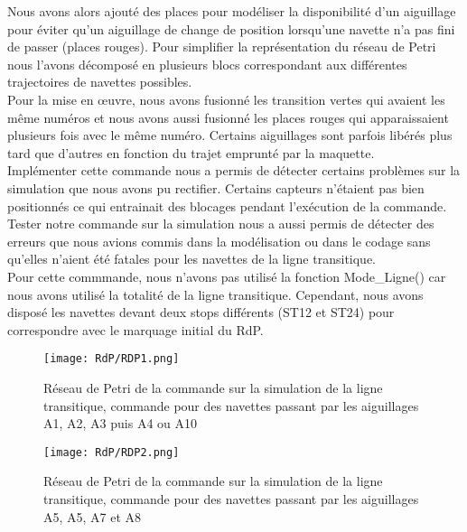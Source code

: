 \documentclass[a4paper,french, titlepage]{book}
\begin{document}
Nous avons alors ajouté des places pour modéliser la disponibilité d'un aiguillage pour éviter qu'un aiguillage de change de position lorsqu'une navette n'a pas fini de passer (places rouges). Pour simplifier la représentation du réseau de Petri nous l'avons décomposé en plusieurs blocs correspondant aux différentes trajectoires de navettes possibles.\\

Pour la mise en œuvre, nous avons fusionné les transition vertes qui avaient les même numéros et nous avons aussi fusionné les places rouges qui apparaissaient plusieurs fois avec le même numéro. Certains aiguillages sont parfois libérés plus tard que d'autres en fonction du trajet emprunté par la maquette.\\

Implémenter cette commande nous a permis de détecter certains problèmes sur la simulation que nous avons pu rectifier. Certains capteurs n'étaient pas bien positionnés ce qui entrainait des blocages pendant l'exécution de la commande. Tester notre commande sur la simulation nous a aussi permis de détecter des erreurs que nous avions commis dans la modélisation ou dans le codage sans qu'elles n'aient été fatales pour les navettes de la ligne transitique.\\

Pour cette commmande, nous n'avons pas utilisé la fonction Mode\_Ligne() car nous avons utilisé la totalité de la ligne transitique. Cependant, nous avons disposé les navettes devant deux stops différents (ST12 et ST24) pour correspondre avec le marquage initial du RdP.\\

\vspace{5cm}

\begin{figure}[H] 
\begin{center}
\texttt{[image: RdP/RDP1.png]} 
\end{center}
\caption{Réseau de Petri de la commande sur la simulation de la ligne transitique, commande pour des navettes passant par les aiguillages A1, A2, A3 puis A4 ou A10}
\label{RdP_1234_simu}
\end{figure}

\begin{figure}[H] 
\begin{center}
\texttt{[image: RdP/RDP2.png]} 
\end{center}
\caption{Réseau de Petri de la commande sur la simulation de la ligne transitique, commande pour des navettes passant par les aiguillages A5, A5, A7 et A8}
\label{RdP_5678_simu}
\end{figure}
\end{document}
